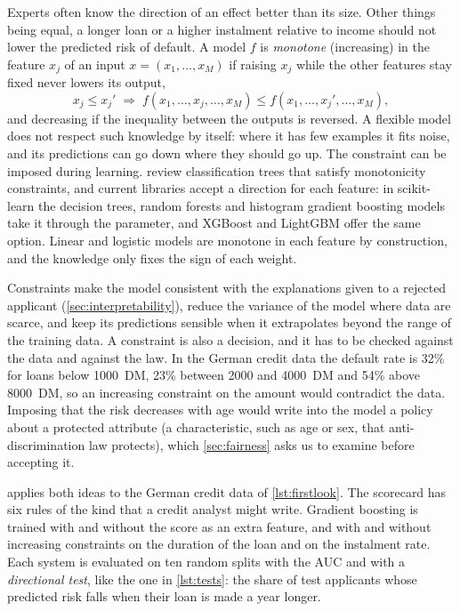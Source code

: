 Experts often know the direction of an effect better than its size. Other things being equal, a
longer loan or a higher instalment relative to income should not lower the predicted risk of
default. A model $f$ is \emph{monotone} (increasing) in the feature $x_j$ of an input $x=(x_1,\dots,x_M)$ if raising $x_j$
while the other features stay fixed never lowers its output,
\begin{equation}\label{eq:monotone}
x_j\le x_j' \;\Rightarrow\; f(x_1,\dots,x_j,\dots,x_M)\le f(x_1,\dots,x_j',\dots,x_M),
\end{equation}
and decreasing if the inequality between the outputs is reversed. A flexible model does not
respect such knowledge by itself: where it has few examples it fits noise, and its predictions
can go down where they should go up. The constraint can be imposed during learning.
\citet{potharst2002classification} review classification trees that satisfy monotonicity
constraints, and current libraries accept a direction for each feature: in scikit-learn the
decision trees, random forests and histogram gradient boosting models take it through the
 parameter, and XGBoost \citep{chen2016xgboost} and LightGBM
\citep{ke2017lightgbm} offer the same option. Linear and logistic models are monotone in each
feature by construction, and the knowledge only fixes the sign of each weight.

Constraints make the model consistent with the explanations given to a rejected applicant
(\cref{sec:interpretability}), reduce the variance of the model where data are scarce, and keep
its predictions sensible when it extrapolates beyond the range of the training data. A
constraint is also a decision, and it has to be checked against the data and against the law.
In the German credit data the default rate is 32\% for loans below 1000~DM, 23\% between
2000 and 4000~DM and 54\% above 8000~DM, so an increasing constraint on the amount would
contradict the data. Imposing that the risk decreases with age would write into the model a
policy about a protected attribute (a characteristic, such as age or sex, that anti-discrimination law protects), which \cref{sec:fairness} asks us to examine before
accepting it.

 applies both ideas to the German credit data of \cref{lst:firstlook}. The
scorecard has six rules of the kind that a credit analyst might write. Gradient
boosting is trained with and without the score as an extra feature, and with and without
increasing constraints on the duration of the loan and on the instalment rate. Each system is
evaluated on ten random splits with the AUC and with a \emph{directional test}, like the
one in \cref{lst:tests}: the share of test applicants whose predicted risk falls when their
loan is made a year longer.

